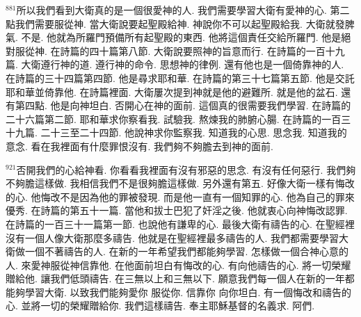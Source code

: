 \documentclass{book}
\begin{document}
$^{881}$所以我們看到大衛真的是一個很愛神的人.
我們需要學習大衛有愛神的心.
第二點我們需要服從神.
當大衛說要起聖殿給神.
神說你不可以起聖殿給我.
大衛就發脾氣.
不是.
他就為所羅門預備所有起聖殿的東西.
他將這個責任交給所羅門.
他是絕對服從神.
在詩篇的四十篇第八節.
大衛說要照神的旨意而行.
在詩篇的一百十九篇.
大衛遵行神的道.
遵行神的命令.
思想神的律例.
還有他也是一個倚靠神的人.
在詩篇的三十四篇第四節.
他是尋求耶和華.
在詩篇的第三十七篇第五節.
他是交託耶和華並倚靠他.
在詩篇裡面.
大衛屢次提到神就是他的避難所.
就是他的盆石.
還有第四點.
他是向神坦白.
否開心在神的面前.
這個真的很需要我們學習.
在詩篇的二十六篇第二節.
耶和華求你察看我.
試驗我.
熬煉我的肺腑心腸.
在詩篇的一百三十九篇.
二十三至二十四節.
他說神求你監察我.
知道我的心思.
思念我.
知道我的意念.
看在我裡面有什麼罪恨沒有.
我們夠不夠膽去到神的面前.

$^{921}$否開我們的心給神看.
你看看我裡面有沒有邪惡的思念.
有沒有任何惡行.
我們夠不夠膽這樣做.
我相信我們不是很夠膽這樣做.
另外還有第五.
好像大衛一樣有悔改的心.
他悔改不是因為他的罪被發現.
而是他一直有一個知罪的心.
他為自己的罪來優秀.
在詩篇的第五十一篇.
當他和拔士巴犯了奸淫之後.
他就衷心向神悔改認罪.
在詩篇的一百三十一篇第一節.
也說他有謙卑的心.
最後大衛有禱告的心.
在聖經裡沒有一個人像大衛那麼多禱告.
他就是在聖經裡最多禱告的人.
我們都需要學習大衛做一個不著禱告的人.
在新的一年希望我們都能夠學習.
怎樣做一個合神心意的人.
來愛神服從神信靠他.
在他面前坦白有悔改的心.
有向他禱告的心.
將一切榮耀贈給他.
讓我們低頭禱告.
在三無以上和三無以下.
願意我們每一個人在新的一年都能夠學習大衛.
以致我們能夠愛你 服從你.
信靠你 向你坦白.
有一個悔改和禱告的心.
並將一切的榮耀贈給你.
我們這樣禱告.
奉主耶穌基督的名義求.
阿們.
\newpage
\end{document}

